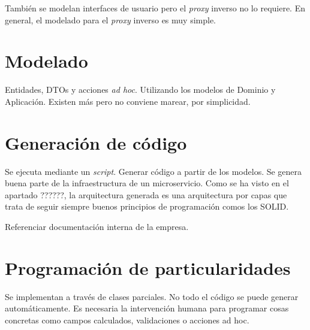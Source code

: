\documentclass[11pt,spanish,listoffigures]{tfgetsinf}
\begin{document}
También se modelan interfaces de usuario pero el \emph{proxy} inverso no lo requiere.
En general, el modelado para el \emph{proxy} inverso es muy simple.

	\section{Modelado}

Entidades, DTOs y acciones \emph{ad hoc}.
Utilizando los modelos de Dominio y Aplicación. Existen más pero no conviene marear, por simplicidad. 

	\section{Generación de código}

Se ejecuta mediante un \emph{script}.
Generar código a partir de los modelos. Se genera buena parte de la infraestructura de un microservicio.
Como se ha visto en el apartado ??????, la arquitectura generada es una arquitectura por capas que trata de seguir siempre buenos principios de programación comos los SOLID.

Referenciar documentación interna de la empresa.

	\section{Programación de particularidades}

Se implementan a través de clases parciales.
No todo el código se puede generar automáticamente. Es necesaria la intervención humana para programar cosas concretas como campos calculados, validaciones o acciones ad hoc.
\end{document}
